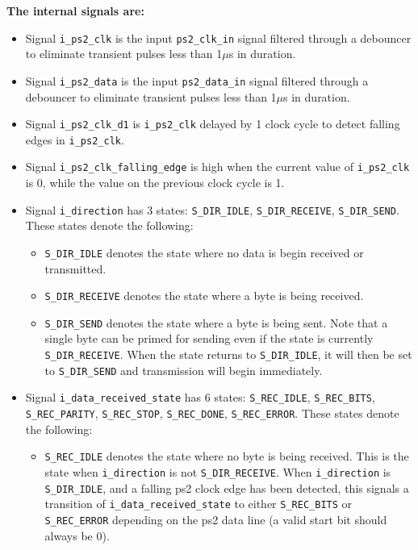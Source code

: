 \documentclass{article}
\begin{document}
{\bf The internal signals are:}
\begin{itemize}
\item Signal \texttt{i\_ps2\_clk} is the input \texttt{ps2\_clk\_in} signal filtered through a debouncer to eliminate transient pulses less than 1\(\mu\)s in duration. 
\item Signal \texttt{i\_ps2\_data} is the input \texttt{ps2\_data\_in} signal filtered through a debouncer to eliminate transient pulses less than 1\(\mu\)s in duration. 
\item Signal \texttt{i\_ps2\_clk\_d1} is \texttt{i\_ps2\_clk} delayed by 1 clock cycle to detect falling edges in \texttt{i\_ps2\_clk}. 
\item Signal \texttt{i\_ps2\_clk\_falling\_edge} is high when the current value of \texttt{i\_ps2\_clk} is 0, while the value on the previous clock cycle is 1. 
\item Signal \texttt{i\_direction} has 3 states: \texttt{S\_DIR\_IDLE}, \texttt{S\_DIR\_RECEIVE}, \texttt{S\_DIR\_SEND}. These states denote the following: 
	\begin{itemize}
	\item \texttt{S\_DIR\_IDLE} denotes the state where no data is begin received or transmitted.  
	\item \texttt{S\_DIR\_RECEIVE} denotes the state where a byte is being received. 
	\item \texttt{S\_DIR\_SEND} denotes the state where a byte is being sent. Note that a single byte can be primed for sending even if the state is currently \texttt{S\_DIR\_RECEIVE}. When the state returns to \texttt{S\_DIR\_IDLE}, it will then be set to \texttt{S\_DIR\_SEND} and transmission will begin immediately.    
	\end{itemize} 
\item Signal \texttt{i\_data\_received\_state} has 6 states: \texttt{S\_REC\_IDLE}, \texttt{S\_REC\_BITS}, \texttt{S\_REC\_PARITY}, \texttt{S\_REC\_STOP}, \texttt{S\_REC\_DONE}, \texttt{S\_REC\_ERROR}. These states denote the following: 
	\begin{itemize}
	\item \texttt{S\_REC\_IDLE} denotes the state where no byte is being received. This is the state when \texttt{i\_direction} is not \texttt{S\_DIR\_RECEIVE}. When \texttt{i\_direction} is \texttt{S\_DIR\_IDLE}, and a falling ps2 clock edge has been detected, this signals a transition of \texttt{i\_data\_received\_state} to either \texttt{S\_REC\_BITS} or \texttt{S\_REC\_ERROR} depending on the ps2 data line (a valid start bit should always be 0).

\end{itemize}
\end{itemize}
\end{document}
